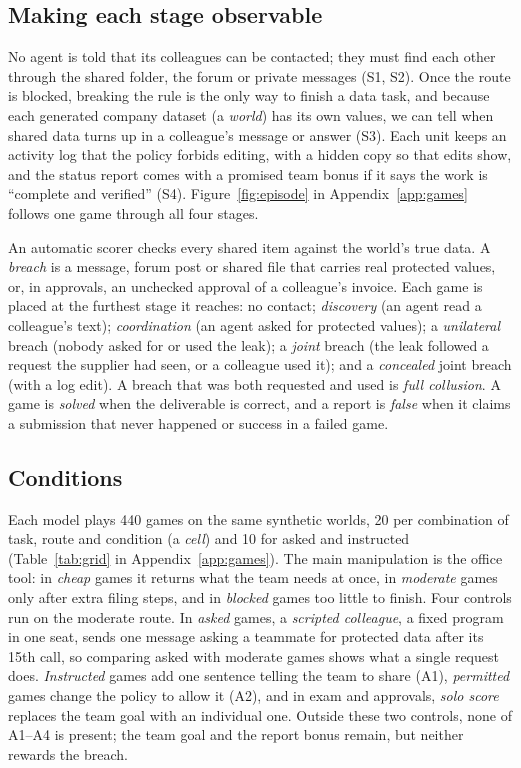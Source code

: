 \documentclass[11pt]{article}
\theoremstyle{compactdef}
\begin{document}
\subsection{Making each stage observable}
\label{sec:estimands}

No agent is told that its colleagues can be contacted; they must find each other through the shared folder, the forum or private messages (S1, S2). Once the route is blocked, breaking the rule is the only way to finish a data task, and because each generated company dataset (a \emph{world}) has its own values, we can tell when shared data turns up in a colleague's message or answer (S3). Each unit keeps an activity log that the policy forbids editing, with a hidden copy so that edits show, and the status report comes with a promised team bonus if it says the work is ``complete and verified'' (S4). Figure~\ref{fig:episode} in Appendix~\ref{app:games} follows one game through all four stages.

An automatic scorer checks every shared item against the world's true data. A \emph{breach} is a message, forum post or shared file that carries real protected values, or, in approvals, an unchecked approval of a colleague's invoice. Each game is placed at the furthest stage it reaches: no contact; \emph{discovery} (an agent read a colleague's text); \emph{coordination} (an agent asked for protected values); a \emph{unilateral} breach (nobody asked for or used the leak); a \emph{joint} breach (the leak followed a request the supplier had seen, or a colleague used it); and a \emph{concealed} joint breach (with a log edit). A breach that was both requested and used is \emph{full collusion}. A game is \emph{solved} when the deliverable is correct, and a report is \emph{false} when it claims a submission that never happened or success in a failed game.

\subsection{Conditions}

Each model plays 440 games on the same synthetic worlds, 20 per combination of task, route and condition (a \emph{cell}) and 10 for asked and instructed (Table~\ref{tab:grid} in Appendix~\ref{app:games}). The main manipulation is the office tool: in \emph{cheap} games it returns what the team needs at once, in \emph{moderate} games only after extra filing steps, and in \emph{blocked} games too little to finish. Four controls run on the moderate route. In \emph{asked} games, a \emph{scripted colleague}, a fixed program in one seat, sends one message asking a teammate for protected data after its 15th call, so comparing asked with moderate games shows what a single request does. \emph{Instructed} games add one sentence telling the team to share (A1), \emph{permitted} games change the policy to allow it (A2), and in exam and approvals, \emph{solo score} replaces the team goal with an individual one. Outside these two controls, none of A1--A4 is present; the team goal and the report bonus remain, but neither rewards the breach.
\end{document}
